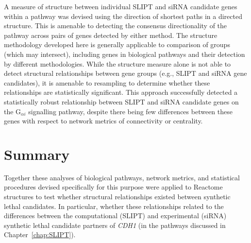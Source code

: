 A measure of  structure between individual \gls{SLIPT} and \gls{siRNA} candidate genes within a \gls{pathway} was devised using the direction of \glspl{shortest path} in a directed  structure. This is amenable to detecting the consensus directionality of the \gls{pathway} across pairs of genes detected by either method. The  structure methodology developed here is generally applicable to comparison of  groups (which may intersect), including genes in biological \glspl{pathway} and their detection by different methodologies. While the  structure measure alone is not able to detect structural relationships between gene groups (e.g., \gls{SLIPT} and \gls{siRNA} gene candidates), it is amenable to resampling to determine whether these relationships are statistically significant. This approach successfully detected a statistically robust relationship between \gls{SLIPT} and \gls{siRNA} candidate genes on the G$_{\alpha i}$ signalling \gls{pathway}, despite there being few differences between these genes with respect to network metrics of connectivity or centrality.

\section{Summary}

Together these analyses of biological \glspl{pathway}, network metrics, and statistical procedures devised specifically for this purpose were applied to Reactome  structures to test whether structural relationships existed between \gls{synthetic lethal} candidates. In particular, whether these relationships related to the differences between the computational (\gls{SLIPT}) and experimental (\gls{siRNA}) \gls{synthetic lethal} candidate partners of \textit{CDH1} (in the \glspl{pathway} discussed in Chapter~\ref{chap:SLIPT}).

